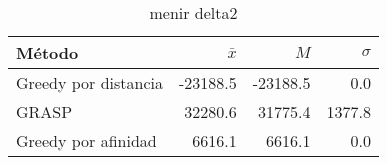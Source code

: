 \begin{table}[h!]
\centering
\begin{tabular}{|l|r|r|r|}
\hline
              Método &  $\bar{x}$ &      $M$ &  $\sigma$ \\
\hline
Greedy por distancia &   -23188.5 & -23188.5 &       0.0 \\
               GRASP &    32280.6 &  31775.4 &    1377.8 \\
 Greedy por afinidad &     6616.1 &   6616.1 &       0.0 \\
\hline
\end{tabular}
\caption{menir delta2}
\label{menir_delta2}
\end{table}
